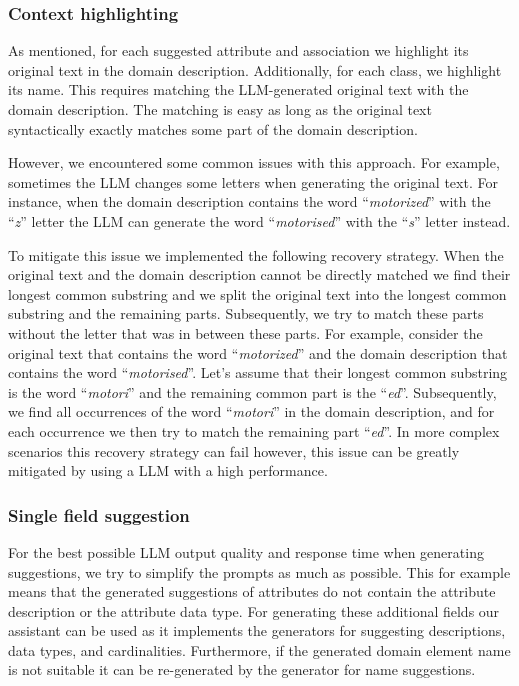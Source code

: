 \subsubsection{Context highlighting}
\label{sec:context_highlighting}

As mentioned, for each suggested attribute and association we highlight its original text in the domain description. Additionally, for each class, we highlight its name. This requires matching the LLM-generated original text with the domain description. The matching is easy as long as the original text syntactically exactly matches some part of the domain description.

However, we encountered some common issues with this approach. For example, sometimes the LLM changes some letters when generating the original text. For instance, when the domain description contains the word ``\textit{motorized}'' with the ``\textit{z}'' letter the LLM can generate the word ``\textit{motorised}'' with the ``\textit{s}'' letter instead.

To mitigate this issue we implemented the following recovery strategy. When the original text and the domain description cannot be directly matched we find their longest common substring and we split the original text into the longest common substring and the remaining parts. Subsequently, we try to match these parts without the letter that was in between these parts. For example, consider the original text that contains the word ``\textit{motorized}'' and the domain description that contains the word ``\textit{motorised}''. Let's assume that their longest common substring is the word ``\textit{motori}'' and the remaining common part is the ``{\textit{ed}}''. Subsequently, we find all occurrences of the word ``\textit{motori}'' in the domain description, and for each occurrence we then try to match the remaining part ``\textit{ed}''. In more complex scenarios this recovery strategy can fail however, this issue can be greatly mitigated by using a LLM with a high performance.


\subsubsection{Single field suggestion}

For the best possible LLM output quality and response time when generating suggestions, we try to simplify the prompts as much as possible. This for example means that the generated suggestions of attributes do not contain the attribute description or the attribute data type. For generating these additional fields our assistant can be used as it implements the generators for suggesting descriptions, data types, and cardinalities. Furthermore, if the generated domain element name is not suitable it can be re-generated by the generator for name suggestions.


